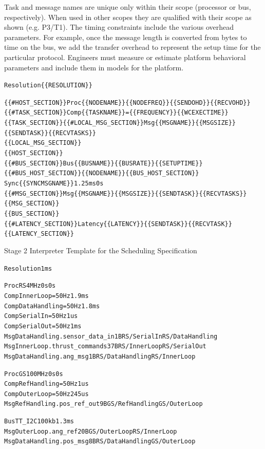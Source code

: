 Task and message names are unique only within their scope (processor or bus, respectively).  When used 
in other scopes they are qualified with their scope as shown (e.g. P3/T1). The timing constraints include 
the various overhead parameters.  For example, once the message length is converted from bytes to time on 
the bus, we add the transfer overhead to represent the setup time for the particular protocol.  Engineers 
must measure or estimate platform behavioral parameters and include them in models for the 
platform\cite{modeling:platform}.

\begin{table}
\centering
\begin{alltt}
\scriptsize
Resolution \{\{RESOLUTION\}\}

\{\{\#HOST_SECTION\}\}Proc \{\{NODENAME\}\} \{\{NODEFREQ\}\} \{\{SENDOHD\}\} \{\{RECVOHD\}\}
\{\{\#TASK_SECTION\}\}Comp \{\{TASKNAME\}\} =\{\{FREQUENCY\}\} \{\{WCEXECTIME\}\}
\{\{\/TASK_SECTION\}\}\{\{\#LOCAL_MSG_SECTION\}\}Msg \{\{MSGNAME\}\} \{\{MSGSIZE\}\} \{\{SENDTASK\}\} \{\{RECVTASKS\}\}
\{\{\/LOCAL_MSG_SECTION\}\}
\{\{\/HOST_SECTION\}\}
\{\{\#BUS_SECTION\}\}Bus \{\{BUSNAME\}\} \{\{BUSRATE\}\} \{\{SETUPTIME\}\} \{\{\#BUS_HOST_SECTION\}\}\{\{NODENAME\}\} \{\{\/BUS_HOST_SECTION\}\}
Sync \{\{SYNCMSGNAME\}\} 1.25ms 0s
\{\{\#MSG_SECTION\}\}Msg \{\{MSGNAME\}\} \{\{MSGSIZE\}\} \{\{SENDTASK\}\} \{\{RECVTASKS\}\}
\{\{\/MSG_SECTION\}\}
\{\{\/BUS_SECTION\}\}
\{\{\#LATENCY_SECTION\}\}Latency \{\{LATENCY\}\} \{\{SENDTASK\}\} \{\{RECVTASK\}\}
\{\{\/LATENCY_SECTION\}\}
\end{alltt}
\caption{Stage 2 Interpreter Template for the Scheduling Specification}
\label{code:sched_templ}
\end{table}


\begin{table}
\centering
\begin{alltt}
Resolution 1ms

Proc RS 4MHz 0s 0s
Comp InnerLoop =50Hz 1.9ms
Comp DataHandling =50Hz 1.8ms
Comp SerialIn =50Hz 1us
Comp SerialOut =50Hz 1ms
Msg DataHandling.sensor_data_in 1B RS/SerialIn RS/DataHandling 
Msg InnerLoop.thrust_commands 37B RS/InnerLoop RS/SerialOut
Msg DataHandling.ang_msg 1B RS/DataHandling RS/InnerLoop 

Proc GS 100MHz 0s 0s
Comp RefHandling =50Hz 1us
Comp OuterLoop =50Hz 245us
Msg RefHandling.pos_ref_out 9B GS/RefHandling GS/OuterLoop 

Bus TT_I2C 100kb 1.3ms
Msg OuterLoop.ang_ref 20B GS/OuterLoop RS/InnerLoop 
Msg DataHandling.pos_msg 8B RS/DataHandling GS/OuterLoop 
\end{alltt}
\caption{Generated scheduling spec for the Quad Integrator example.}
\label{code:qint_spec}
\end{table}

